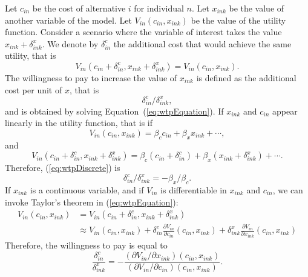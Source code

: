 \documentclass[12pt,a4paper]{article}
\newcommand{\req}[1]{(\ref{#1})}
\begin{document}
Let $c_{in}$ be the cost of alternative $i$ for individual $n$.
Let $x_{ink}$ be the value of another variable of the model.
Let $V_{in}(c_{in},x_{ink})$ be the value of the utility function.
Consider a scenario where the variable of interest takes the value
$x_{ink} + \delta^x_{ink}$.
We denote by $\delta^c_{in}$ the additional  cost  that would achieve the same utility, that is
\begin{equation}
  \label{eq:wtpEquation}
V_{in}(c_{in}+\delta^c_{in},x_{ink}+\delta^x_{ink}) = V_{in}(c_{in},x_{ink}).
\end{equation}
The willingness to pay to increase the value of $x_{ink}$ is defined
as the additional cost per unit of $x$, that is
\begin{equation}
  \label{eq:wtpDiscrete}
  \delta^c_{in}/\delta^x_{ink},
\end{equation}
and is obtained by solving Equation~\req{eq:wtpEquation}.
If $x_{ink}$ and $c_{in}$ appear linearly in the utility function, that
is if
\begin{equation}
V_{in}(c_{in},x_{ink}) = \beta_c c_{in} + \beta_x x_{ink} + \cdots,
\end{equation}
and
\begin{equation}
V_{in}(c_{in}+\delta^c_{in},x_{ink}+\delta^x_{ink}) = \beta_c (c_{in}+\delta^c_{in}) + \beta_x (x_{ink}+\delta^x_{ink}) + \cdots.
\end{equation}
Therefore, \req{eq:wtpDiscrete} is
\begin{equation}
  \label{eq:wtpLinear}
  \delta^c_{in}/\delta^x_{ink} = -\beta_x / \beta_c.
\end{equation}
If $x_{ink}$ is a continuous variable, and if $V_{in}$ is
differentiable in $x_{ink}$ and $c_{in}$, we can invoke  Taylor's
theorem in \req{eq:wtpEquation}:
\begin{equation}
\begin{aligned}
V_{in}(c_{in},x_{ink})&= V_{in}(c_{in}+\delta^c_{in},x_{ink}+\delta^x_{ink})\\ &\approx V_{in}(c_{in},x_{ink}) + \delta^c_{in} \frac{\partial V_{in}}{\partial c_{in}}(c_{in},x_{ink})+ \delta^x_{ink} \frac{\partial V_{in}}{\partial x_{ink}}(c_{in},x_{ink})
\end{aligned}
\end{equation}
Therefore, the willingness to pay is equal to
\begin{equation}
  \label{eq:wtpContinuous}
\frac{\delta^c_{in}}{ \delta^x_{ink}} = - \frac{(\partial V_{in}/\partial x_{ink})(c_{in},x_{ink})}{(\partial V_{in}/\partial c_{in})(c_{in},x_{ink})}.
\end{equation}
\end{document}
